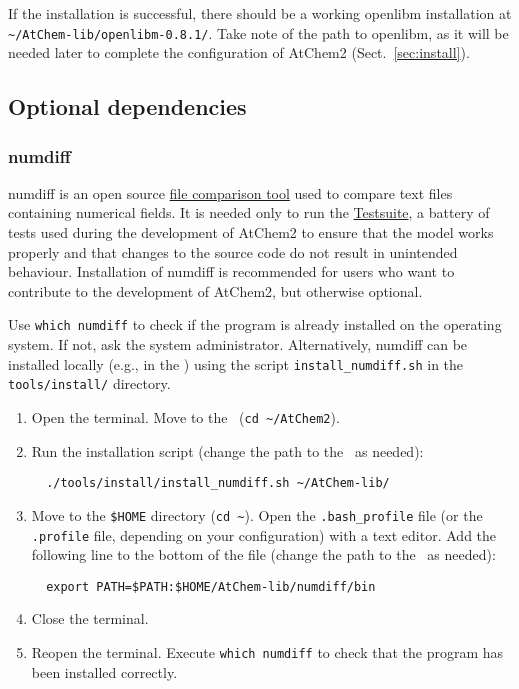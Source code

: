 If the installation is successful, there should be a working openlibm
installation at \texttt{\textasciitilde/AtChem-lib/openlibm-0.8.1/}.
Take note of the path to openlibm, as it will be needed later to
complete the configuration of AtChem2 (Sect.~\ref{sec:install}).

\subsection{Optional dependencies} \label{subsec:optional-dependencies}

\subsubsection{numdiff}

numdiff is an open source \href{https://www.nongnu.org/numdiff}{file comparison tool}
used to compare text files containing numerical fields. It is needed only
to run the \hyperref[sec:test-suite]{Testsuite}, a battery of tests
used during the development of AtChem2 to ensure that the model works
properly and that changes to the source code do not result in
unintended behaviour. Installation of numdiff is recommended for users
who want to contribute to the development of AtChem2, but otherwise
optional.

Use \verb|which numdiff| to check if the program is already installed
on the operating system. If not, ask the system administrator.
Alternatively, numdiff can be installed locally (e.g., in the \depdir)
using the script \texttt{install\_numdiff.sh} in the
\texttt{tools/install/} directory.

\begin{enumerate}
\item Open the terminal. Move to the \maindir\ (\verb|cd ~/AtChem2|).
\item Run the installation script (change the path to the \depdir\ as
  needed):
  \begin{verbatim}
  ./tools/install/install_numdiff.sh ~/AtChem-lib/
  \end{verbatim}
\item Move to the \texttt{\$HOME} directory (\texttt{cd\ \textasciitilde}).
  Open the \texttt{.bash\_profile} file (or the \texttt{.profile}
  file, depending on your configuration) with a text editor. Add the
  following line to the bottom of the file (change the path to the
  \depdir\ as needed):
  \begin{verbatim}
  export PATH=$PATH:$HOME/AtChem-lib/numdiff/bin
  \end{verbatim}
\item Close the terminal.
\item Reopen the terminal. Execute \verb|which numdiff| to check that
  the program has been installed correctly.
\end{enumerate}

